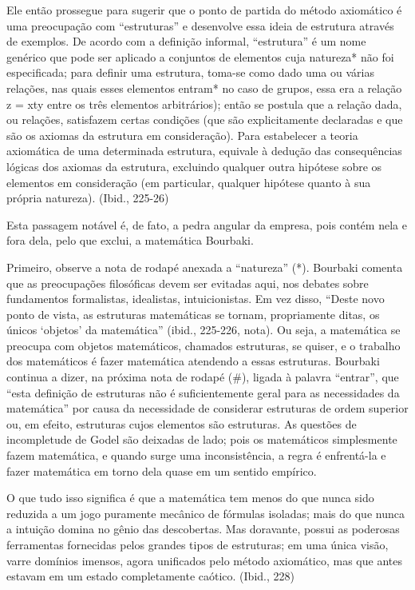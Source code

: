 \documentclass[12pt]{article}
\begin{document}
Ele então prossegue para sugerir que o ponto de partida do método axiomático é uma preocupação com “estruturas” e desenvolve essa ideia de estrutura através de exemplos. De acordo com a definição informal, “estrutura” é um nome genérico que pode ser aplicado a conjuntos de elementos cuja natureza* não foi especificada; para definir uma estrutura, toma-se como dado uma ou várias relações, nas quais esses elementos entram* no caso de grupos, essa era a relação z = xty entre os três elementos arbitrários); então se postula que a relação dada, ou relações, satisfazem certas condições (que são explicitamente declaradas e que são os axiomas da estrutura em consideração). Para estabelecer a teoria axiomática de uma determinada estrutura, equivale à dedução das consequências lógicas dos axiomas da estrutura, excluindo qualquer outra hipótese sobre os elementos em consideração (em particular, qualquer hipótese quanto à sua própria natureza). (Ibid., 225-26)

Esta passagem notável é, de fato, a pedra angular da empresa, pois contém nela e fora dela, pelo que exclui, a matemática Bourbaki.

Primeiro, observe a nota de rodapé anexada a “natureza” (*). Bourbaki comenta que as preocupações filosóficas devem ser evitadas aqui, nos debates sobre fundamentos formalistas, idealistas, intuicionistas. Em vez disso, “Deste novo ponto de vista, as estruturas matemáticas se tornam, propriamente ditas, os únicos ‘objetos’ da matemática” (ibid., 225-226, nota). Ou seja, a matemática se preocupa com objetos matemáticos, chamados estruturas, se quiser, e o trabalho dos matemáticos é fazer matemática atendendo a essas estruturas. Bourbaki continua a dizer, na próxima nota de rodapé (#), ligada à palavra “entrar”, que “esta definição de estruturas não é suficientemente geral para as necessidades da matemática” por causa da necessidade de considerar estruturas de ordem superior ou, em efeito, estruturas cujos elementos são estruturas. As questões de incompletude de Godel são deixadas de lado; pois os matemáticos simplesmente fazem matemática, e quando surge uma inconsistência, a regra é enfrentá-la e fazer matemática em torno dela quase em um sentido empírico.

O que tudo isso significa é que a matemática tem menos do que nunca sido reduzida a um jogo puramente mecânico de fórmulas isoladas; mais do que nunca a intuição domina no gênio das descobertas. Mas doravante, possui as poderosas ferramentas fornecidas pelos grandes tipos de estruturas; em uma única visão, varre domínios imensos, agora unificados pelo método axiomático, mas que antes estavam em um estado completamente caótico. (Ibid., 228)
\end{document}
